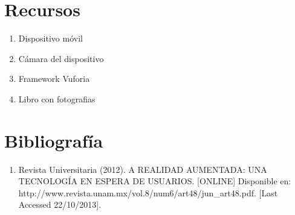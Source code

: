 \documentclass[11pt]{article} %
\begin{document}
\section{Recursos}

\begin{enumerate} 
	 \item Dispositivo móvil
	 \item Cámara del dispositivo
	 \item Framework Vuforia
	 \item Libro con fotografias
 \end{enumerate}
\section{Bibliografía}
\begin{enumerate} 
 \item Revista Universitaria (2012). A REALIDAD AUMENTADA: UNA TECNOLOGÍA EN ESPERA DE USUARIOS. [ONLINE] Disponible en: http://www.revista.unam.mx/vol.8/num6/art48/jun\_art48.pdf. [Last Accessed 22/10/2013].

 \end{enumerate}
\end{document}
